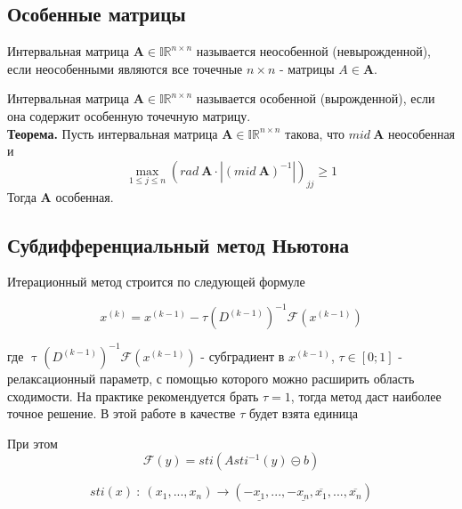 \documentclass[../body.tex]{subfiles}
\begin{document}
    \subsection{Особенные матрицы}
    
        Интервальная матрица $\textbf{A} \in \mathbb{I}\mathbb{R}^{n \times n}$ называется неособенной (невырожденной), если неособенными являются все точечные $n \times n$ - матрицы $A \in \textbf{A}$.  
        
        Интервальная матрица $\textbf{A} \in \mathbb{I}\mathbb{R}^{n \times n}$ называется особенной (вырожденной), если она содержит особенную точечную матрицу.\\ 
        
        \textbf{Теорема.}
         Пусть интервальная матрица  $\textbf{A} \in \mathbb{I}\mathbb{R}^{n \times n}$ такова, что $mid \ \textbf{A}$ неособенная и 
         \begin{equation*}
             \max\limits_{1 \leq j \leq n} ( rad \ \textbf{A} \cdot |(mid \  \textbf{A})^{-1}|)_{jj} \geq 1
         \end{equation*}
        Тогда \textbf{A} особенная.
     \subsection{Субдифференциальный метод Ньютона}
            Итерационный метод строится по следующей формуле
            
            \begin{equation}
                x^{(k)} = x^{(k-1)} - \tau (D^{(k-1)})^{-1}\mathcal{F}(x^{(k-1)})
            \end{equation}
            
            где $\uptau(D^{(k-1)})^{-1}\mathcal{F}(x^{(k-1)})$ - субградиент в $x^{(k-1)}$, $\tau \in [0;1]$ - релаксационный параметр, с помощью которого можно расширить область сходимости. На практике рекомендуется брать $\tau=1$, тогда метод даст наиболее точное решение. В этой работе в качестве $\tau$ будет взята единица
            
            При этом 
            \begin{equation}
                \mathcal{F}(y) = \textit{sti}(A\textit{sti}^{-1}(y) \circleddash b)
            \end{equation}
            
            \begin{equation}
                \textit{sti}(x) \: : \: (x_1, ... , x_n) \xrightarrow{} ( -\underline{x_1}, ... , -\underline{x_n}, \overline{x_1}, ... , \overline{x_n})
            \end{equation}
            
\end{document}
